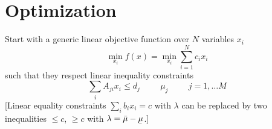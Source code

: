 \documentclass[a4paper,10pt]{article}
\begin{document}
\newcommand{\totalnetconsumption}{p^{-}_{t}}
\newcommand{\totalnetproduction}{p^{+}_{t}}
\newcommand{\totalselfconsumption}{p^{\circ}_{t}}

\newcommand{\lagrangian}{\mathcal{L}}

\newcommand{\allocatePeer}[1][s \rightarrow n]{A_{#1,t}}
\newcommand{\allocateFlow}[1][n]{F_{#1,\ell,t}}
\newcommand{\allocateTransaction}[1][s \rightarrow n]{A_{#1,\ell,t}}
\newcommand{\allocateCapexGeneration}[1][n]{\mathcal{C}^{G}_{#1,t}}
\newcommand{\allocateCapexFlow}[1][n]{\mathcal{C}^{F}_{#1,t}}
\newcommand{\allocateOpex}[1][n]{\mathcal{O}_{#1,t}}
\newcommand{\allocateEmissionCost}[1][n]{\mathcal{E}_{#1,t}}


\newcommand{\emission}[1][n]{e_{#1,s}}
\newcommand{\emissionPrice}{\mu_{\text{CO2}}}
\newcommand{\megawatthour}{MWh$_\text{el}$}
\newcommand{\totalcost}{\mathcal{TC}}
\newcommand{\totalOpexGeneration}{\mathcal{O}}
\newcommand{\totalOpexFlow}{\mathcal{O}^F}
\newcommand{\totalCapexGeneration}{\mathcal{C}^G}
\newcommand{\totalCapexFlow}{\mathcal{C}^F}
\newcommand{\totalEmissionCost}{\mathcal{E}}
\newcommand{\totalRest}{\mathcal{R}}
\newcommand{\totalDemand}{\mathcal{D}}

\newcommand{\resultsin}[1]{\hspace{6pt} \bot  \hspace{6pt} #1}
\newcommand{\Forall}[1]{\hspace{10pt} \forall \,\, #1 }
\newcommand{\pdv}[2]{\dfrac{\partial #1}{\partial #2}}


\section{Optimization}


\def\l{\lambda}
\def\K{\kappa}
\def\m{\mu}
\def\G{\Gamma}
\def\d{\partial}
\def\cL{\mathcal{L}}


Start with a generic linear objective function over $N$ variables $x_i$
\begin{equation}
 \min_{x_i} f(x) =  \min_{x_i}  \sum_{i=1}^N c_i x_i
\end{equation}
such that they respect linear inequality constraints
\begin{equation}
  \sum_i A_{ji} x_i \leq d_j \hspace{1cm} \m_j \hspace{1cm} j=1,\dots M
\end{equation}
    [Linear equality constraints $\sum_i b_i x_i = c$ with $\lambda$ can be replaced by two inequalities $\leq c$, $\geq c$ with $\lambda = \bar{\m} - \ubar{\m}$.]
\end{document}
